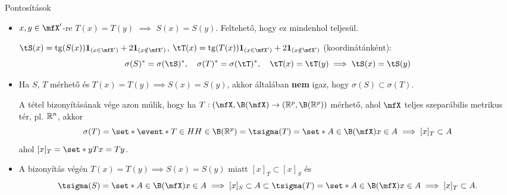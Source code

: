 \documentclass[aspectratio=169,notheorems,9pt,\option]{beamer}
\begin{document}
\begin{frame}{Pontosítások}
  \begin{itemize}
    \item $x,y\in \mfX'$-re $T(x)=T(y)$ $\implies$ $S(x)=S(y)$. 
    Feltehető, hogy ez mindenhol teljesül.
    
    $\tS(x)=\tg(S(x))\I{x\in \mfX'}+2\I{x\notin\mfX'}$, 
    $\tT(x)=\tg(T(x))\I{x\in \mfX'}+2\I{x\notin\mfX'}$ (koordinátánként): 
    \begin{displaymath}
      \sigma(S)^*=\sigma(\tS)^*,\quad \sigma(T)^*=\sigma(\tT)^*,\quad 
      \tT(x)=\tT(y) \implies\tS(x)=\tS(y)
    \end{displaymath} 
    \item  Ha $S$, $T$ mérhető és $T(x)=T(y)\implies S(x)=S(y)$, akkor általában \textbf{nem} igaz, 
    hogy $\sigma(S)\subset\sigma(T)$. 

    A tétel bizonyításának vége azon múlik, hogy 
    ha $T:(\mfX,\B(\mfX)\to(\real^p,\B(\real^p))$ mérhető, 
    ahol $\mfX$ teljes szeparábilis metrikus tér, pl. $\mathbb{R}^n$, akkor 
    \begin{displaymath}
      \sigma(T)=\set*{\event*{T\in H}}{H\in\B(\real^p)}=\tsigma(T)=\set*{A\in\B(\mfX)}{x\in A\implies [x]_T\subset A}
    \end{displaymath}
    ahol $[x]_T=\set*{y}{Tx=Ty}$.
    
    \item A bizonyítás végén $T(x)=T(y)\implies S(x)=S(y)$ miatt $[x]_T\subset [x]_S$ és 
    \begin{displaymath}
      \tsigma(S)=\set*{A\in\B(\mfX)}{x\in A\implies [x]_S\subset A}\subset
      \tsigma(T)=\set*{A\in\B(\mfX)}{x\in A\implies [x]_T\subset A}.
    \end{displaymath}
  \end{itemize}
\end{frame}
\end{document}
